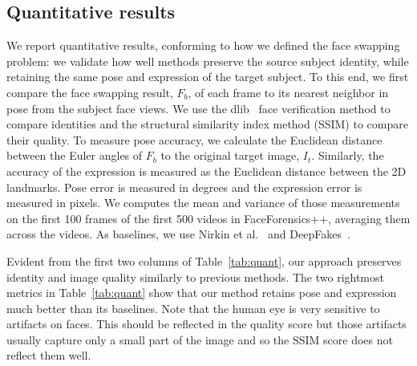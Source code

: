 \subsection{Quantitative results}
\label{subsec:Quantitative results}
We report quantitative results, conforming to how we defined the face swapping problem: we validate how well methods preserve the source subject identity, while retaining the same pose and expression of the target subject. To this end, we first compare the face swapping result, $F_b$, of each frame to its nearest neighbor in pose from the subject face views. We use the dlib~\cite{dlib09} face verification method to compare identities and the structural similarity index method (SSIM) to compare their quality. To measure pose accuracy, we calculate the Euclidean distance between the Euler angles of $F_b$ to the original target image, $I_t$. Similarly, the accuracy of the expression is measured as the Euclidean distance between the 2D landmarks. Pose error is measured in degrees and the expression error is measured in pixels. We computes the mean and variance of those measurements on the first 100 frames of the first 500 videos in FaceForensics++, averaging them across the videos. As baselines, we use Nirkin et al.~\cite{nirkin2018face} and DeepFakes~\cite{DeepFakes}. 

Evident from the first two columns of Table~\ref{tab:quant}, our approach preserves identity and image quality similarly to previous methods. The two rightmost metrics in Table~\ref{tab:quant} show that our method retains pose and expression much better than its baselines. Note that the human eye is very sensitive to artifacts on faces. This should be reflected in the quality score but those artifacts usually capture only a small part of the image and so the SSIM score does not reflect them well.

\begin{table}[t!]
\caption{{\em Quantitative swapping results.} On FaceForensics++ videos~\cite{roessler2019faceforensics++}.}\label{tab:quant}\vspace{-4mm}
\end{table}

